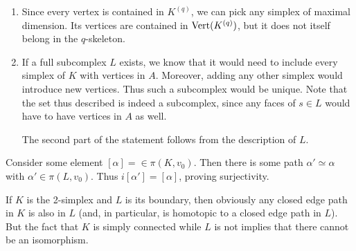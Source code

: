 \documentclass[../../solutions.tex]{subfiles}
\begin{document}
\begin{exercise} \leavevmode
\begin{enumerate}
\item 
Since every vertex is contained in $K^{(q)}$, we can pick any simplex of maximal dimension.
Its vertices are contained in $\operatorname{Vert}(K^{(q)})$, but it does not itself belong in the $q$-skeleton.
\item 
If a full subcomplex $L$ exists, we know that it would need to include every simplex of $K$ with vertices in $A$.
Moreover, adding any other simplex would introduce new vertices.
Thus such a subcomplex would be unique.
Note that the set thus described is indeed a subcomplex, since any faces of $s\in L$ would have to have vertices in $A$ as well.

The second part of the statement follows from the description of $L$.
\end{enumerate}
\end{exercise}

\begin{exercise} \leavevmode
Consider some element $[\alpha]=\in\pi(K,v_0)$.
Then there is some path $\alpha'\simeq\alpha$ with $\alpha'\in\pi(L,v_0)$.
Thus $i[\alpha']=[\alpha]$, proving surjectivity.

If $K$ is the 2-simplex and $L$ is its boundary, then obviously any closed edge path in $K$ is also in $L$ (and, in particular, is homotopic to a closed edge path in $L$).
But the fact that $K$ is simply connected while $L$ is not implies that there cannot be an isomorphism.
\end{exercise}
\end{document}
